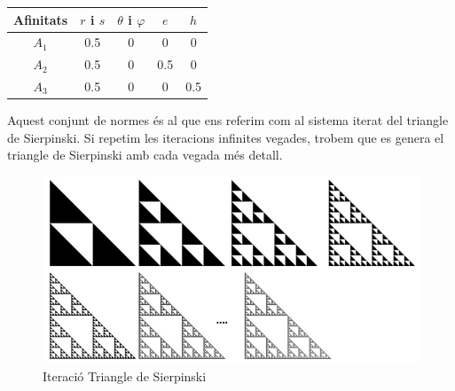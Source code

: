 \documentclass[12pt]{report}
\begin{document}
\vspace{-8.5em} \hspace{-3em}
\begin{tabular}{|c |c |c |c |c |}
\hline
Afinitats & $r$ i $s$ & $\theta$ i $\varphi$& $e$ & $h$\\
\hline
$A_1$ & 0.5 & 0 & 0 & 0 \\
\hline
$A_2$ & 0.5 & 0 & 0.5 & 0 \\
\hline
$A_3$ & 0.5 & 0 & 0 & 0.5 \\
\hline
\end{tabular}
\newline
\newline
\newline 
Aquest conjunt de normes és al que ens referim com al sistema iterat del triangle de Sierpinski. Si repetim les iteracions infinites vegades, trobem que es genera el triangle de Sierpinski amb cada vegada més detall.
\newline
\begin{figure}[H]
 \includegraphics[width=1\textwidth]{IS.PNG}
 \caption{Iteració Triangle de Sierpinski}
 \end{figure}
\justifying
\end{document}
